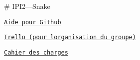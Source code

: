 ﻿\# I\+P\+I2---Snake


\begin{DoxyItemize}
\item \href{https://github.com/Obiwan1995/IPI2---Snake/wiki}{\tt Aide pour Github}
\item \href{https://trello.com/ipi2lesmixtes}{\tt Trello (pour l\textquotesingle{}organisation du groupe)}
\item \href{https://docs.google.com/document/d/1KgGv_7oLafnNLdYUu0ohbveplwjhyfn9H9RPiSjVEdQ/edit}{\tt Cahier des charges} 
\end{DoxyItemize}